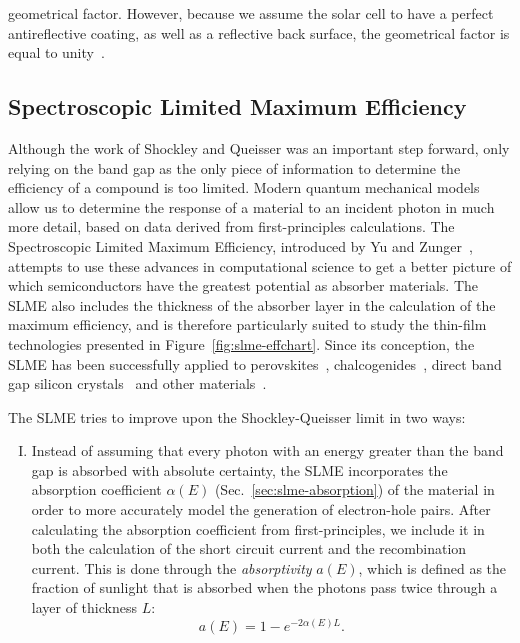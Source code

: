 \begin{refsection}
geometrical factor. However, because we assume the solar cell to have a 
perfect antireflective coating, as well as a reflective back surface, the 
geometrical factor is equal to unity~\cite{Ruhle2016}. 
 
 
\subsection{Spectroscopic Limited Maximum Efficiency} \label{sec:slme-SLME} 
 
Although the work of Shockley and Queisser was an important step forward, only 
relying on the band gap as the only piece of information to determine the 
efficiency of a compound is too limited. Modern quantum mechanical models 
allow us to determine the response of a material to an incident photon in much 
more detail, based on data derived from first-principles calculations. The 
Spectroscopic Limited Maximum Efficiency, introduced by Yu and 
Zunger~\cite{Yu2012}, attempts to use these advances in computational science 
to get a better picture of which semiconductors have the greatest potential as 
absorber materials. The SLME also includes the thickness of the absorber layer 
in the calculation of the maximum efficiency, and is therefore particularly 
suited to study the thin-film technologies presented in 
Figure~\ref{fig:slme-effchart}. Since its conception, the SLME has been 
successfully applied to perovskites~\cite{Yin2014, Yin2015, Yin2015b, 
Meng2016}, chalcogenides~\cite{Hong2016, Sarmadian2016}, direct band gap 
silicon crystals~\cite{Lee2014, Oh2015} and other materials~\cite{Yu2012b, 
Yokoyama2013, Heo2014, Huang2015}.  
 
The SLME tries to improve upon the Shockley-Queisser limit in two ways:  
\vspace{0.1in} 
\begin{enumerate}[I.] 
 
\item Instead of assuming that every photon with an energy greater than the 
band gap is absorbed with absolute certainty, the SLME incorporates the 
absorption coefficient $\alpha(E)$ (Sec.~\ref{sec:slme-absorption}) of the 
material in order to more accurately model the generation of electron-hole 
pairs. After calculating the absorption coefficient from first-principles, we 
include it in both the calculation of the short circuit current and the 
recombination current. This is done through the \textit{absorptivity} $a(E)$, 
which is defined as the fraction of sunlight that is absorbed when the photons 
pass twice through a layer of thickness $L$: 
\begin{equation} \label{eq:slme-absorptivity} 
a(E) = 1 - e^{-2 \alpha(E) L}. 
\end{equation} 
 

\end{enumerate}
\end{refsection}
